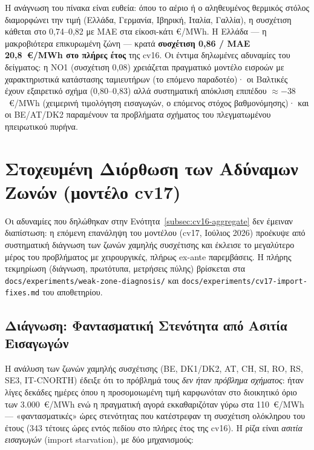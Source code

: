 Η ανάγνωση του πίνακα είναι ευθεία: όπου το αέριο ή ο αληθευμένος θερμικός στόλος διαμορφώνει την τιμή (Ελλάδα, Γερμανία, Ιβηρική, Ιταλία, Γαλλία), η συσχέτιση κάθεται στο 0,74--0,82 με MAE στα είκοσι-κάτι €/MWh. Η Ελλάδα --- η μακροβιότερα επικυρωμένη ζώνη --- κρατά \textbf{συσχέτιση 0,86 / MAE 20,8~€/MWh στο πλήρες έτος} της cv16. Οι έντιμα δηλωμένες αδυναμίες του δείγματος: η NO1 (συσχέτιση 0,08) χρειάζεται πραγματικό μοντέλο εισροών με χαρακτηριστικά κατάστασης ταμιευτήρων (το επόμενο παραδοτέο)· οι Βαλτικές έχουν εξαιρετικό σχήμα (0,80--0,83) αλλά συστηματική απόκλιση επιπέδου $\approx -38$~€/MWh (χειμερινή τιμολόγηση εισαγωγών, ο επόμενος στόχος βαθμονόμησης)· και οι BE/AT/DK2 παραμένουν τα προβλήματα σχήματος του πλεγματωμένου ηπειρωτικού πυρήνα.


\section{Στοχευμένη Διόρθωση των Αδύναμων Ζωνών (μοντέλο cv17)}
\label{sec:cv17-weak-zones}

Οι αδυναμίες που δηλώθηκαν στην Ενότητα~\ref{subsec:cv16-aggregate} δεν έμειναν διαπίστωση: η επόμενη επανάληψη του μοντέλου (cv17, Ιούλιος 2026) προέκυψε από συστηματική διάγνωση των ζωνών χαμηλής συσχέτισης και έκλεισε το μεγαλύτερο μέρος του προβλήματος με χειρουργικές, πλήρως ex-ante παρεμβάσεις. Η πλήρης τεκμηρίωση (διάγνωση, πρωτότυπα, μετρήσεις πύλης) βρίσκεται στα \texttt{docs/experiments/weak-zone-diagnosis/} και \texttt{docs/experiments/cv17-import-fixes.md} του αποθετηρίου.

\subsection{Διάγνωση: Φαντασματική Στενότητα από Ασιτία Εισαγωγών}
\label{subsec:phantom-scarcity}

Η ανάλυση των ζωνών χαμηλής συσχέτισης (BE, DK1/DK2, AT, CH, SI, RO, RS, SE3, IT-CNORTH) έδειξε ότι το πρόβλημά τους \emph{δεν ήταν πρόβλημα σχήματος}: ήταν λίγες δεκάδες ημέρες όπου η προσομοιωμένη τιμή καρφωνόταν στο διοικητικό όριο των 3.000~€/MWh ενώ η πραγματική αγορά εκκαθαριζόταν γύρω στα 110~€/MWh --- «φαντασματικές» ώρες στενότητας που κατέστρεφαν τη συσχέτιση ολόκληρου του έτους (343 τέτοιες ώρες εντός πεδίου στο πλήρες έτος της cv16). Η ρίζα είναι \emph{ασιτία εισαγωγών} (import starvation), με δύο μηχανισμούς:

